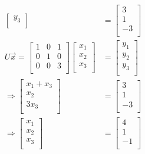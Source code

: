 \documentclass{article}
\begin{document}
\begin{align*}
\begin{bmatrix}
         y_3 \\
    \end{bmatrix}&=\begin{bmatrix}
         3 \\
         1 \\
         -3 \\
    \end{bmatrix}\\
    U\vec{x}=\begin{bmatrix}
        1 &0  &1   \\
         0&1  &0   \\
         0&0  &3   \\
    \end{bmatrix}\begin{bmatrix}
         x_1 \\
          x_2\\
          x_3\\
    \end{bmatrix}&=\begin{bmatrix}
         y_1 \\
         y_2 \\
         y_3 \\
    \end{bmatrix}\\
    \Longrightarrow \begin{bmatrix}
         x_1+x_3 \\
          x_2\\
          3x_3\\
    \end{bmatrix}&=\begin{bmatrix}
         3 \\
         1 \\
         -3 \\
    \end{bmatrix}\\
    \Longrightarrow \begin{bmatrix}
         x_1 \\
         x_2 \\
         x_3 \\
    \end{bmatrix}&=\begin{bmatrix}
         4 \\
         1 \\
         -1 \\
    \end{bmatrix}
\end{align*}
\end{document}

